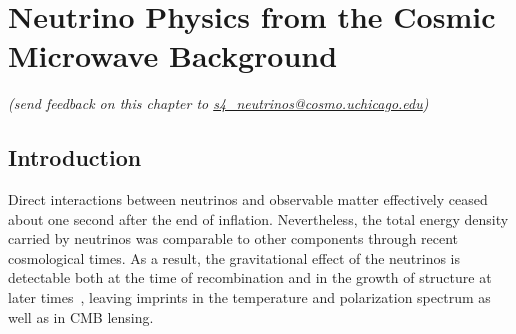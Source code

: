 
\chapter{Neutrino Physics from the Cosmic Microwave Background}


\def\beq{\begin{equation}}
\def\eeq{\end{equation}}

\def\bea{\begin{eqnarray}}
\def\eea{\end{eqnarray}}

\def\Neff{N_{\rm eff}}
\def\Nf{N_{\rm eff}}
\def\gs{g_{\star}}
\def\Mpl{M_{\rm pl}}
\newcommand{\nucl}[3]{ \ensuremath{ \phantom{\ensuremath{^{#1}_{#2}}} \llap{\ensuremath{^{#1}}} \llap{\ensuremath{_{\rule{0pt}{.75em}#2}}} \mbox{#3} } }


\def\gtrsim{\raise-.75ex\hbox{$\buildrel>\over\sim$}}

\begin{center}
{\small \it (send feedback on this chapter to \href{mailto:s4_neutrinos@cosmo.uchicago.edu}{s4\_neutrinos@cosmo.uchicago.edu})}
\end{center}

\section{Introduction}



Direct interactions between neutrinos and observable matter effectively ceased about one second after the end of inflation.  Nevertheless, the total energy density carried by neutrinos was comparable to other components through recent cosmological times.  As a result, the gravitational effect of the neutrinos is detectable both at the time of recombination and in the growth of structure at later times~\cite{Abazajian:2013oma}, leaving imprints in the temperature and polarization spectrum as well as in CMB lensing.

